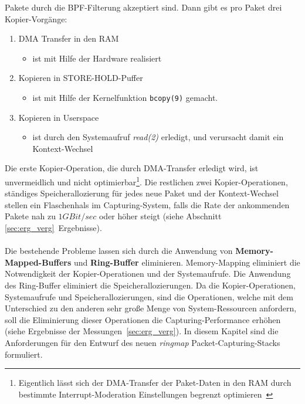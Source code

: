 Pakete durch die BPF-Filterung akzeptiert sind. Dann gibt es pro Paket drei
Kopier-Vorgänge:
\begin{enumerate}
\item DMA Transfer in den RAM
	\begin{itemize}
		\item ist mit Hilfe der Hardware realisiert
	\end{itemize}
\item Kopieren in STORE-HOLD-Puffer
	\begin{itemize}
		\item ist mit Hilfe der Kernelfunktion \verb+bcopy(9)+ gemacht. 
	\end{itemize}
\item Kopieren in Userspace
	\begin{itemize}
		\item ist durch den Systemaufruf \emph{read(2)} erledigt, und verursacht damit
			ein Kontext-Wechsel
	\end{itemize}
\end{enumerate}
Die erste Kopier-Operation, die durch DMA-Transfer erledigt wird, ist
unvermeidlich und nicht optimierbar\footnote{Eigentlich lässt sich der
DMA-Transfer der Paket-Daten in den RAM durch bestimmte Interrupt-Moderation
Einstellungen begrenzt optimieren~\cite{intrr_mod, e1000_sdm}}. Die restlichen zwei
Kopier-Operationen, ständiges Speicherallozierung für jedes neue Paket und der
Kontext-Wechsel stellen ein Flaschenhals im Capturing-System, falls die Rate
der ankommenden Pakete nah zu $1GBit/sec$ oder höher steigt (siehe Abschnitt
\ref{sec:erg_verg}~Ergebnisse).\\\\
%
Die bestehende Probleme lassen sich durch die Anwendung von
\textbf{Memory-Mapped-Buffers} und \textbf{Ring-Buffer} eliminieren.
Memory-Mapping eliminiert die Notwendigkeit der Kopier-Operationen und der
Systemaufrufe.  Die Anwendung des Ring-Buffer eliminiert die
Speicherallozierungen. Da die Kopier-Operationen, Systemaufrufe und
Speicherallozierungen, sind die Operationen, welche mit dem Unterschied zu den
anderen sehr große Menge von System-Ressourcen anfordern, soll die Eliminierung
dieser Operationen die Capturing-Performance erhöhen (siehe Ergebnisse der 
Messungen~\ref{sec:erg_verg}).
\newpage
{}
In diesem Kapitel sind die Anforderungen für den Entwurf des neuen \emph{ringmap}
Packet-Capturing-Stacks formuliert. 
